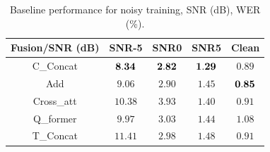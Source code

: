 \documentclass[conference]{IEEEtran}
\begin{document}
\begin{table}[tbh]
	\centering
	\caption{Baseline performance for noisy training, SNR (dB), WER (\%).}
	\begin{tabular}{|c||c||c||c||c|}
		\hline
		Fusion/SNR (dB) &SNR-5 & SNR0 & SNR5 & Clean \\		
		\hline	
		\hline
		C\_Concat  & ${\bf 8.34}$ & ${\bf 2.82}$ & ${\bf 1.29}$ & $ 0.89$ \\		
		\hline	
		Add  & $9.06$ & $2.90$ & $1.45$ & ${\bf 0.85}$ \\						
		\hline
		Cross\_att & $10.38$ & $3.93$ & $1.40$ &$ 0.91$ \\
		\hline
		Q\_former & $9.97$ & $3.03$ &$ 1.44$ &$ 1.08$ \\
		\hline		
		\hline	
		T\_Concat & $11.41$ & $2.98$ & $1.48$ & $0.91$ \\
		\hline									
	\end{tabular}
	\label{tab:tab2}
\end{table}
\end{document}
